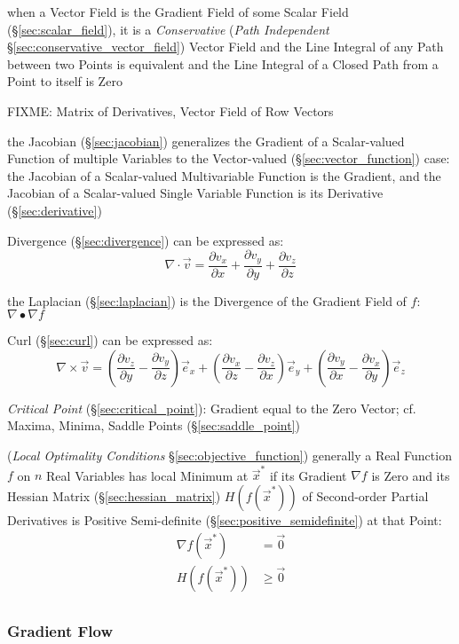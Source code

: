 when a Vector Field is the Gradient Field of some Scalar Field
(\S\ref{sec:scalar_field}), it is a \emph{Conservative} (\emph{Path
  Independent} \S\ref{sec:conservative_vector_field}) Vector Field and the Line
Integral of any Path between two Points is equivalent and the Line Integral of
a Closed Path from a Point to itself is Zero

FIXME: Matrix of Derivatives, Vector Field of Row Vectors

the Jacobian (\S\ref{sec:jacobian}) generalizes the Gradient of a Scalar-valued
Function of multiple Variables to the Vector-valued
(\S\ref{sec:vector_function}) case: the Jacobian of a Scalar-valued
Multivariable Function is the Gradient, and the Jacobian of a Scalar-valued
Single Variable Function is its Derivative (\S\ref{sec:derivative})

Divergence (\S\ref{sec:divergence}) can be expressed as:
\[
  \nabla \cdot \vec{v} =
    \frac{\partial v_x}{\partial x} +
    \frac{\partial v_y}{\partial y} +
    \frac{\partial v_z}{\partial z}
\]

the Laplacian (\S\ref{sec:laplacian}) is the Divergence of the Gradient Field
of $f$: $\nabla \bullet \nabla f$

Curl (\S\ref{sec:curl}) can be expressed as:
\[
  \nabla\times\vec{v} =
    (\frac{\partial v_z}{\partial y}-\frac{\partial v_y}{\partial z})\vec{e}_x +
    (\frac{\partial v_x}{\partial z}-\frac{\partial v_z}{\partial x})\vec{e}_y +
    (\frac{\partial v_y}{\partial x}-\frac{\partial v_x}{\partial y})\vec{e}_z
\]

\emph{Critical Point} (\S\ref{sec:critical_point}): Gradient equal to the Zero
Vector; cf. Maxima, Minima, Saddle Points (\S\ref{sec:saddle_point})

(\emph{Local Optimality Conditions} \S\ref{sec:objective_function}) generally a
Real Function $f$ on $n$ Real Variables has local Minimum at $\vec{x}^*$ if its
Gradient $\nabla f$ is Zero and its Hessian Matrix (\S\ref{sec:hessian_matrix})
$H(f(\vec{x}^*))$ of Second-order Partial Derivatives is Positive Semi-definite
(\S\ref{sec:positive_semidefinite}) at that Point:
\begin{align*}
  \nabla f(\vec{x}^*) & =    \vec{0} \\
  H(f(\vec{x}^*))     & \geq \vec{0} \\
\end{align*}



\subsubsection{Gradient Flow}\label{sec:gradient_flow}

